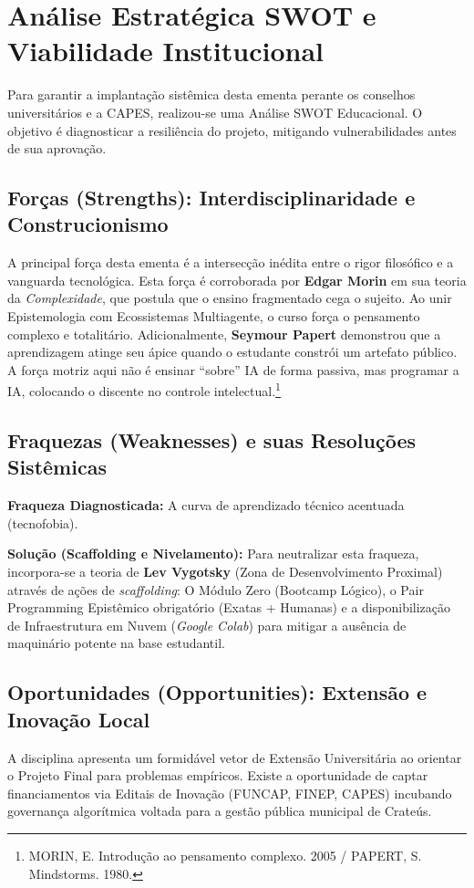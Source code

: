 \documentclass[12pt,a4paper]{article}
\begin{document}
\newpage
\section{Análise Estratégica SWOT e Viabilidade Institucional}

Para garantir a implantação sistêmica desta ementa perante os conselhos universitários e a CAPES, realizou-se uma Análise SWOT Educacional. O objetivo é diagnosticar a resiliência do projeto, mitigando vulnerabilidades antes de sua aprovação.

\subsection{Forças (Strengths): Interdisciplinaridade e Construcionismo}
A principal força desta ementa é a intersecção inédita entre o rigor filosófico e a vanguarda tecnológica. Esta força é corroborada por \textbf{Edgar Morin} em sua teoria da \textit{Complexidade}, que postula que o ensino fragmentado cega o sujeito. Ao unir Epistemologia com Ecossistemas Multiagente, o curso força o pensamento complexo e totalitário. Adicionalmente, \textbf{Seymour Papert} demonstrou que a aprendizagem atinge seu ápice quando o estudante constrói um artefato público. A força motriz aqui não é ensinar ``sobre'' IA de forma passiva, mas programar a IA, colocando o discente no controle intelectual.\footnote{MORIN, E. Introdução ao pensamento complexo. 2005 / PAPERT, S. Mindstorms. 1980.}

\subsection{Fraquezas (Weaknesses) e suas Resoluções Sistêmicas}
\textbf{Fraqueza Diagnosticada:} A curva de aprendizado técnico acentuada (tecnofobia). 

\textbf{Solução (Scaffolding e Nivelamento):}
Para neutralizar esta fraqueza, incorpora-se a teoria de \textbf{Lev Vygotsky} (Zona de Desenvolvimento Proximal) através de ações de \textit{scaffolding}: O Módulo Zero (Bootcamp Lógico), o Pair Programming Epistêmico obrigatório (Exatas + Humanas) e a disponibilização de Infraestrutura em Nuvem (\textit{Google Colab}) para mitigar a ausência de maquinário potente na base estudantil.

\subsection{Oportunidades (Opportunities): Extensão e Inovação Local}
A disciplina apresenta um formidável vetor de Extensão Universitária ao orientar o Projeto Final para problemas empíricos. Existe a oportunidade de captar financiamentos via Editais de Inovação (FUNCAP, FINEP, CAPES) incubando governança algorítmica voltada para a gestão pública municipal de Crateús.
\end{document}
